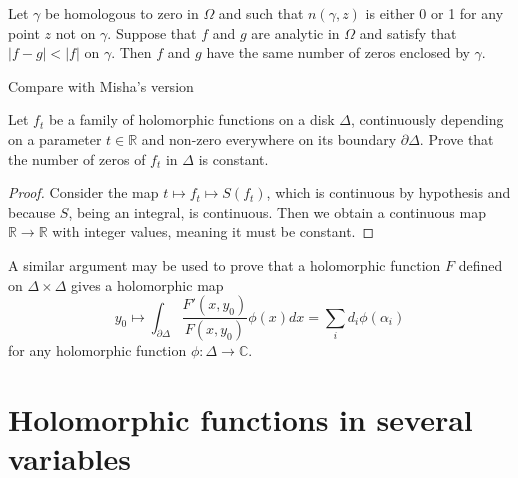 \begin{lemma}
\label{lemma-Rouche-theorem}
\begin{reference}
\cite[Chapter 5, Corollary, p. 153]{ahl}
\end{reference}
Let $\gamma$ be homologous to zero in $\Omega$ and such that $n(\gamma,z)$ is
either 0 or 1 for any point $z$ not on $\gamma$. Suppose that $f$ and $g$ are
analytic in $\Omega$ and satisfy that $|f-g|<|f|$ on $\gamma$. Then $f$ and $g$
have the same number of zeros enclosed by $\gamma$.
\end{lemma}

Compare with Misha's version

\begin{theorem}
\label{theorem-Rouche-theorem-Mishas-version}
Let $f_t$ be a family of holomorphic functions on a disk  $\Delta$, continuously
depending on a parameter $t\in \mathbb{R}$ and non-zero everywhere on its
boundary $\partial\Delta$. Prove that the number of zeros of $f_t$ in $\Delta$
is constant.
\end{theorem}

\begin{proof}
Consider the map $t\mapsto f_t\mapsto S(f_t)$, which is continuous by hypothesis
and because $S$, being an integral, is continuous. Then we obtain a continuous
map $\mathbb{R}\to\mathbb{R}$ with integer values, meaning it must be constant.
\end{proof}

A similar argument may be used to prove that a holomorphic function $F$ defined
on $\Delta\times\Delta$ gives a holomorphic map 
\begin{equation}
\label{equation-zeros-on-polydisk}
y_0\mapsto \int_{\partial\Delta}\frac{F'(x,y_0)}{F(x,y_0)}\phi(x)dx
=\sum_id_i\phi(\alpha_i)
\end{equation}
for any holomorphic function $\phi:\Delta\to\mathbb{C}$.

\section{Holomorphic functions in several variables}
\label{section-holomorphic-functions-in-several-variables}


